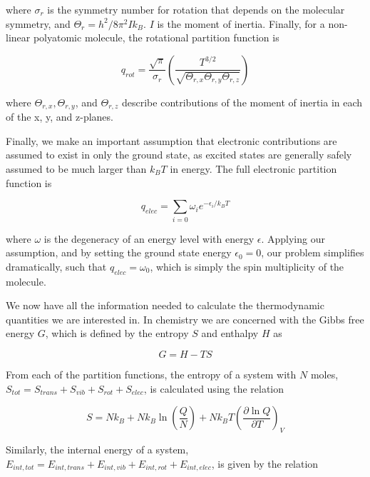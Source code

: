 \noindent where $\sigma_r$ is the symmetry number for rotation that depends on
the molecular symmetry, and $\Theta_r = h^2/8\pi^2Ik_B$. $I$ is the moment of
inertia. Finally, for a non-linear polyatomic molecule, the rotational
partition function is

\begin{equation}
  q_{rot} = \frac{\sqrt{\pi}}{\sigma_r}\left(\frac{T^{3/2}}{\sqrt{\Theta_{r,x}\Theta_{r,y}\Theta_{r,z}}}\right)
\end{equation}

\noindent where $\Theta_{r,x}, \Theta_{r,y}$, and $\Theta_{r,z}$ describe
contributions of the moment of inertia in each of the x, y, and z-planes.

Finally, we make an important assumption that electronic contributions are
assumed to exist in only the ground state, as excited states are generally
safely assumed to be much larger than $k_B T$ in energy. The full electronic
partition function is

\begin{equation}
  q_{elec} = \sum_{i=0} \omega_i e^{-\epsilon_i/k_B T}
\end{equation}

\noindent where $\omega$ is the degeneracy of an energy level with energy
$\epsilon$. Applying our assumption, and by setting the ground state energy
$\epsilon_0=0$, our problem simplifies dramatically, such that $q_{elec} =
\omega_0$, which is simply the spin multiplicity of the molecule.

We now have all the information needed to calculate the thermodynamic
quantities we are interested in. In chemistry we are concerned with the Gibbs
free energy $G$, which is defined by the entropy $S$ and enthalpy $H$ as

\begin{equation}
  G = H - TS
\end{equation}

\noindent From each of the partition functions, the entropy of a system with
$N$ moles, $S_{tot} = S_{trans} + S_{vib } +S_{rot} + S_{elec}$, is calculated
using the relation

\begin{equation}
  S = Nk_B + Nk_B\ln\left( \frac{Q}{N} \right) + Nk_B T \left( \frac{\partial
      \ln Q}{\partial T} \right)_V
\end{equation}

\noindent Similarly, the internal energy of a system, $E_{int,tot} =
E_{int,trans} + E_{int,vib} + E_{int,rot} + E_{int,elec}$, is given by the
relation

